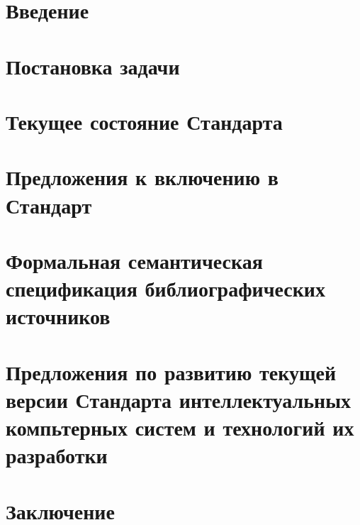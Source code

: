 \section*{Введение}


\newpage
\section{Постановка задачи}


\newpage
\section{Текущее состояние Стандарта}


\newpage
\section{Предложения к включению в Стандарт}


\newpage
\section{Формальная семантическая спецификация библиографических источников}


\newpage
\section{Предложения по развитию текущей версии Стандарта интеллектуальных компьтерных систем и технологий их разработки}


\newpage
\section*{Заключение}

